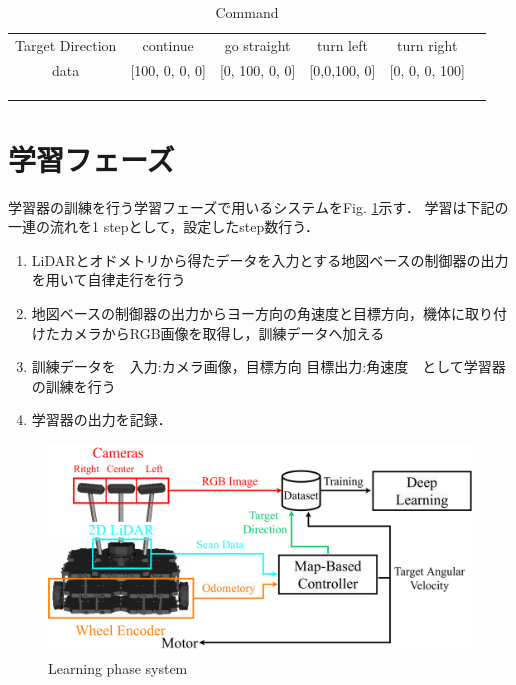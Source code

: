     \begin{table}[h]
      \centering
      \caption{Command}
      \begin{tabular}{ccccll}
      \cline{1-5}
      \multicolumn{1}{|c|}{Target Direction} & \multicolumn{1}{c|}{continue}&\multicolumn{1}{c|}{go straight}          & \multicolumn{1}{c|}{turn left}          & \multicolumn{1}{c|}{turn right}          &  \\ \cline{1-5}
      \multicolumn{1}{|c|}{data}  &\multicolumn{1}{c|}{{[}100, 0, 0, 0{]}}& \multicolumn{1}{c|}{{[}0, 100, 0, 0{]}} & \multicolumn{1}{c|}{{[}0,0,100, 0{]}} & \multicolumn{1}{l|}{{[}0, 0, 0, 100{]}} &  \\ \cline{1-5}
                                 &                                  &                                  &                                  &  \\
                                 &                                  &                                  &                                  &  \\
      \multicolumn{1}{l}{}       &                                  &                                  &                                  & 
      \end{tabular}
      \vspace{-3.0zh}
      \label{tb:command_4}
      \end{table}

\newpage
\section{学習フェーズ}
\label{lerning}
学習器の訓練を行う学習フェーズで用いるシステムをFig. \ref{fig::learningsystem}示す．
学習は下記の一連の流れを1 stepとして，設定したstep数行う．
\begin{enumerate}
    \item LiDARとオドメトリから得たデータを入力とする地図ベースの制御器の出力を用いて自律走行を行う
    \item 地図ベースの制御器の出力からヨー方向の角速度と目標方向，機体に取り付けたカメラからRGB画像を取得し，訓練データへ加える
    \item 訓練データを　入力:カメラ画像，目標方向 目標出力:角速度　として学習器の訓練を行う
    \item 学習器の出力を記録．
  \end{enumerate}

  \begin{figure}[h]
    \centering
    \includegraphics[width = 12cm]{./figs/system_learning.pdf}
    \caption{Learning phase system }
    \label{fig::learningsystem}
\end{figure}

